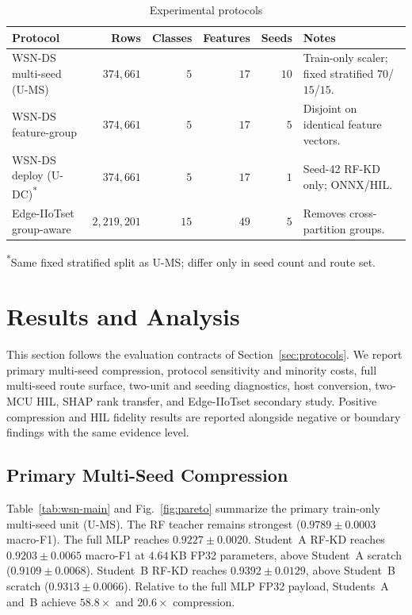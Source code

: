 \documentclass[journal]{IEEEtran}
\newcommand{\ums}{U-MS}
\newcommand{\udc}{U-DC}
\begin{document}
\begin{table}[!t]
\caption{Experimental protocols}
\label{tab:protocols}
\centering
\small
\begin{tabular}{>{\raggedright\arraybackslash}p{35mm}rrrr>{\raggedright\arraybackslash}p{55mm}}
\toprule
Protocol & Rows & Classes & Features & Seeds & Notes \\
\midrule
WSN-DS multi-seed (\ums{}) & $374{,}661$ & $5$ & $17$ & $10$ & Train-only scaler; fixed stratified $70$/$15$/$15$. \\
WSN-DS feature-group & $374{,}661$ & $5$ & $17$ & $5$ & Disjoint on identical feature vectors. \\
WSN-DS deploy (\udc{})\textsuperscript{*} & $374{,}661$ & $5$ & $17$ & $1$ & Seed-42 RF-KD only; ONNX/HIL. \\
Edge-IIoTset group-aware & $2{,}219{,}201$ & $15$ & $49$ & $5$ & Removes cross-partition groups. \\
\bottomrule
\end{tabular}

\vspace{2pt}
{\small \textsuperscript{*}Same fixed stratified split as \ums{}; differ only in seed count and route set.}
\end{table}

\section{Results and Analysis}
\label{sec:results}

This section follows the evaluation contracts of Section~\ref{sec:protocols}.
We report primary multi-seed compression, protocol sensitivity and minority costs, full multi-seed route surface, two-unit and seeding diagnostics, host conversion, two-MCU HIL, SHAP rank transfer, and Edge-IIoTset secondary study.
Positive compression and HIL fidelity results are reported alongside negative or boundary findings with the same evidence level.

\subsection{Primary Multi-Seed Compression}
\label{sec:results-compression}
Table~\ref{tab:wsn-main} and Fig.~\ref{fig:pareto} summarize the primary train-only multi-seed unit (\ums{}).
The RF teacher remains strongest ($0.9789 \pm 0.0003$ macro-F1).
The full MLP reaches $0.9227 \pm 0.0020$.
Student~A RF-KD reaches $0.9203 \pm 0.0065$ macro-F1 at $4.64$\,KB FP32 parameters, above Student~A scratch ($0.9109 \pm 0.0068$).
Student~B RF-KD reaches $0.9392 \pm 0.0129$, above Student~B scratch ($0.9313 \pm 0.0066$).
Relative to the full MLP FP32 payload, Students~A and~B achieve $58.8\times$ and $20.6\times$ compression.
\end{document}
